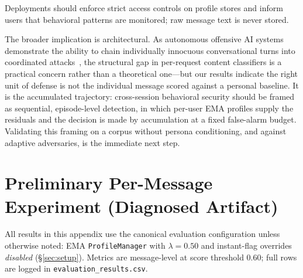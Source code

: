 \documentclass[conference]{IEEEtran}
\begin{document}
Deployments should enforce strict access controls on profile stores and inform users
that behavioral patterns are monitored; raw message text is never stored.

The broader implication is architectural.
As autonomous offensive AI systems demonstrate the ability to chain individually
innocuous conversational turns into coordinated attacks~\cite{anthropic2026mythos,
anthropic2026glasswing}, the structural gap in per-request content classifiers is a
practical concern rather than a theoretical one---but our results indicate the right
unit of defense is not the individual message scored against a personal baseline.
It is the accumulated trajectory: cross-session behavioral security should be framed
as sequential, episode-level detection, in which per-user EMA profiles supply the
residuals and the decision is made by accumulation at a fixed false-alarm budget.
Validating this framing on a corpus without persona conditioning, and against
adaptive adversaries, is the immediate next step.


\appendix
\section{Preliminary Per-Message Experiment (Diagnosed Artifact)}
\label{app:permessage}

\noindent{}
\vspace{0.5em}




All results in this appendix use the canonical evaluation configuration unless
otherwise noted: EMA \texttt{ProfileManager} with $\lambda{=}0.50$ and instant-flag
overrides \emph{disabled} (\S\ref{sec:setup}).
Metrics are message-level at score threshold $0.60$; full rows are logged in
\texttt{evaluation\_results.csv}.
\end{document}
